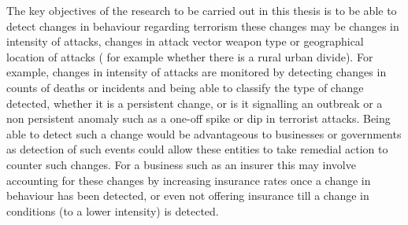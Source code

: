 The key objectives of the research to be carried out in this thesis is to be able to detect changes in behaviour regarding terrorism these changes may be changes in intensity of attacks, changes in attack vector weapon type or geographical location of attacks ( for example whether there is a rural urban divide). For example, changes in intensity of attacks are monitored by detecting changes in counts of deaths or incidents and being able to classify the type of change detected, whether it is a persistent change, or is it signalling an outbreak or a non persistent anomaly such as a one-off spike or dip in terrorist attacks. Being able to detect such a change would be advantageous to businesses or governments as detection of such events could allow these entities to take remedial action to counter such changes. For a business such as an insurer this may involve accounting for these changes by increasing insurance rates once a change in behaviour has been detected, or even not offering insurance till a change in conditions (to a lower intensity) is detected.